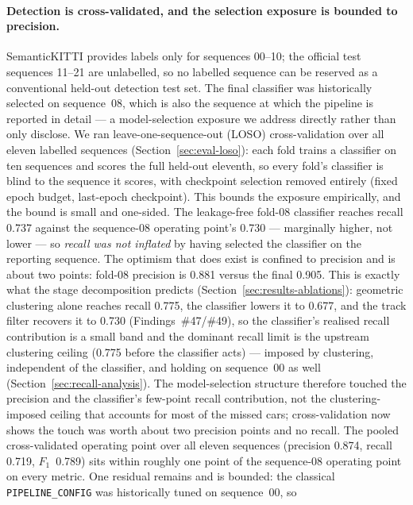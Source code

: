 \paragraph{Detection is cross-validated, and the selection exposure is bounded to precision.}
SemanticKITTI provides labels only for sequences \numrange{00}{10}; the official test
sequences \numrange{11}{21} are unlabelled, so no labelled sequence can be reserved as a
conventional held-out detection test set. The final classifier was historically
selected on sequence~08, which is also the sequence at which the pipeline is reported in
detail --- a model-selection exposure we address directly rather than only disclose. We
ran leave-one-sequence-out (LOSO) cross-validation over all eleven labelled sequences
(Section~\ref{sec:eval-loso}): each fold trains a classifier on ten sequences and scores
the full held-out eleventh, so every fold's classifier is blind to the sequence it
scores, with checkpoint selection removed entirely (fixed epoch budget, last-epoch
checkpoint). This bounds the exposure empirically, and the bound is small and one-sided.
The leakage-free fold-08 classifier reaches recall \num{0.737} against the sequence-08
operating point's \num{0.730} --- marginally higher, not lower --- so \emph{recall was not
inflated} by having selected the classifier on the reporting sequence. The optimism that
does exist is confined to precision and is about two points: fold-08 precision is
\num{0.881} versus the final \num{0.905}. This is exactly what the stage decomposition
predicts (Section~\ref{sec:results-ablations}): geometric clustering alone reaches recall
\num{0.775}, the classifier lowers it to \num{0.677}, and the track filter recovers it to
\num{0.730} (Findings~\#47/\#49), so the classifier's realised recall contribution is a
small band and the dominant recall limit is the upstream clustering ceiling (\num{0.775}
before the classifier acts) --- imposed by clustering, independent of the classifier, and
holding on sequence~00 as well (Section~\ref{sec:recall-analysis}). The
model-selection structure therefore touched the precision and the classifier's few-point
recall contribution, not the clustering-imposed ceiling that accounts for most of the
missed cars; cross-validation now shows the touch was worth about two precision points and
no recall. The pooled cross-validated operating point over all eleven sequences
(precision \num{0.874}, recall \num{0.719}, $F_1$~\num{0.789}) sits within roughly one
point of the sequence-08 operating point on every metric. One residual remains and is
bounded: the classical \texttt{PIPELINE\_CONFIG} was historically tuned on sequence~00, so
